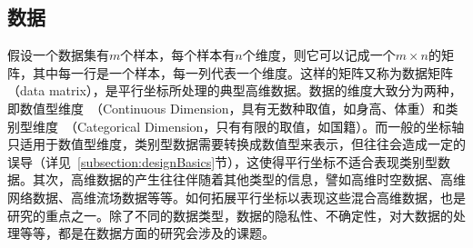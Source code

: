 \documentclass[12pt,twocolumn]{article}
\begin{document}
\subsection{数据}
\label{subsection:dataBasics}
假设一个数据集有$m$个样本，每个样本有$n$个维度，则它可以记成一个$m \times n$的矩阵，其中每一行是一个样本，每一列代表一个维度。这样的矩阵又称为数据矩阵（data matrix），是平行坐标所处理的典型高维数据。数据的维度大致分为两种，即数值型维度~（Continuous Dimension，具有无数种取值，如身高、体重）和类别型维度~（Categorical Dimension，只有有限的取值，如国籍）。而一般的坐标轴只适用于数值型维度，类别型数据需要转换成数值型来表示，但往往会造成一定的误导（详见~\ref{subsection:designBasics}节），这使得平行坐标不适合表现类别型数据。其次，高维数据的产生往往伴随着其他类型的信息，譬如高维时空数据、高维网络数据、高维流场数据等等。如何拓展平行坐标以表现这些混合高维数据，也是研究的重点之一。除了不同的数据类型，数据的隐私性、不确定性，对大数据的处理等等，都是在数据方面的研究会涉及的课题。                                                                                                                                                                                                                                                                                                                                                                                                                                                                                                                                                                                                                                                                                                                                                                                                                                                                                                                                                                                                                                                                                                                                                                                                                                                                                                                                                                                                                                                                                                                                                                                                                                                                                                                                                                                                                                                                                                                                                                                                                                                                                                                                                                                                                                                                                                                                                                                                                                             
\end{document}
